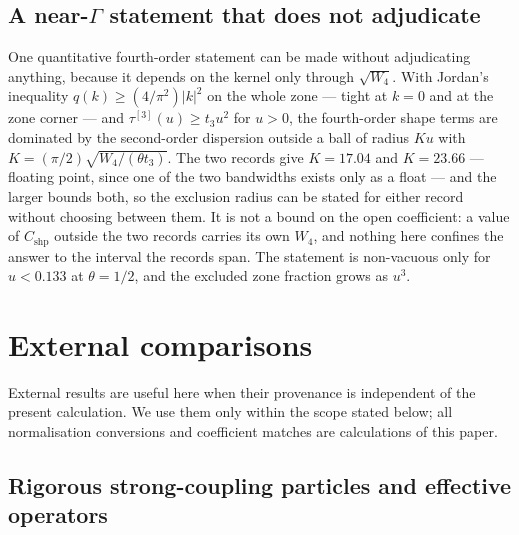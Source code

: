 \documentclass[11pt]{article}
\theoremstyle{plain}
\theoremstyle{definition}
\theoremstyle{remark}
\newcommand{\chk}[1]{}
\begin{document}
\subsection{A \texorpdfstring{near-$\Gamma$}{near-Gamma} statement that does not adjudicate}

One quantitative fourth-order statement can be made without adjudicating
anything, because it depends on the kernel only through $\sqrt{W_4}$. With
Jordan's inequality $q(k)\ge(4/\pi^2)|k|^2$ on the whole zone --- tight at
$k=0$ and at the zone corner --- and
$\tau^{[3]}(u)\ge t_3u^2$ for $u>0$, the
fourth-order shape terms are dominated by the second-order dispersion outside a
ball of radius $Ku$ with
$K=(\pi/2)\sqrt{W_4/(\theta t_3)}$. The two records give $K=17.04$ and
$K=23.66$ --- floating point, since one of the two bandwidths exists only as a
float --- and the larger bounds both, so the exclusion radius can be stated for
either record without choosing between them. It is not a bound on the open
coefficient: a value of $C_{\mathrm{shp}}$ outside the two records carries its
own $W_4$, and nothing here confines the answer to the interval the records
span. The statement is non-vacuous only for $u<0.133$ at $\theta=1/2$,
and the excluded zone fraction grows as $u^3$.
\chk{Jordan bound q(k) >= (4/pi\^{}2)|k|\^{}2 holds on the whole zone}
\chk{the criterion survives C2: K depends on the kernel only through sqrt(W\_4)}
\chk{the statement is non-vacuous only below an explicit coupling}

\section{External comparisons}
\label{sec:external}

External results are useful here when their provenance is independent of the
present calculation. We use them only within the scope stated below; all
normalisation conversions and coefficient matches are calculations of this
paper.

\subsection{Rigorous strong-coupling particles and effective operators}
\label{sec:rigorous-related-work}
\end{document}
